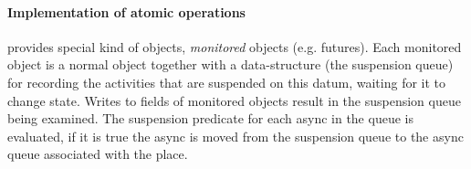 \paragraph{Implementation of atomic operations}
{}\Xtenlib{} provides special kind of objects, {\em monitored} objects
(e.g.{} futures). Each monitored object is a normal \Xten{} object
together with a data-structure (the suspension queue) for recording
the activities that are suspended on this datum, waiting for it to
change state. Writes to fields of monitored objects result in the
suspension queue being examined. The suspension predicate for each
async in the queue is evaluated, if it is true the async is moved from
the suspension queue to the async queue associated with the place.
